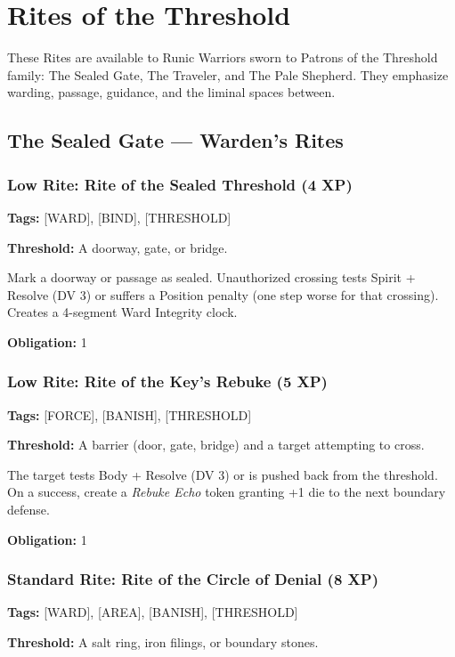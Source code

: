 \section{Rites of the Threshold}

These Rites are available to Runic Warriors sworn to Patrons of the Threshold family: The Sealed Gate, The Traveler, and The Pale Shepherd. They emphasize warding, passage, guidance, and the liminal spaces between.

\subsection{The Sealed Gate — Warden's Rites}

\subsubsection{Low Rite: Rite of the Sealed Threshold (4 XP)}

\textbf{Tags:} [WARD], [BIND], [THRESHOLD]

\textbf{Threshold:} A doorway, gate, or bridge.

Mark a doorway or passage as sealed. Unauthorized crossing tests Spirit + Resolve (DV 3) or suffers a Position penalty (one step worse for that crossing). Creates a 4-segment Ward Integrity clock.

\textbf{Obligation:} 1

\subsubsection{Low Rite: Rite of the Key's Rebuke (5 XP)}

\textbf{Tags:} [FORCE], [BANISH], [THRESHOLD]

\textbf{Threshold:} A barrier (door, gate, bridge) and a target attempting to cross.

The target tests Body + Resolve (DV 3) or is pushed back from the threshold. On a success, create a \textit{Rebuke Echo} token granting +1 die to the next boundary defense.

\textbf{Obligation:} 1

\subsubsection{Standard Rite: Rite of the Circle of Denial (8 XP)}

\textbf{Tags:} [WARD], [AREA], [BANISH], [THRESHOLD]

\textbf{Threshold:} A salt ring, iron filings, or boundary stones.

